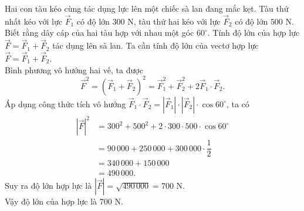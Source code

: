 \begin{ex}%
	Hai con tàu kéo cùng tác dụng lực lên một chiếc sà lan đang mắc kẹt. Tàu thứ nhất kéo với lực $\overrightarrow{F}_1$ có độ lớn $300$ N, tàu thứ hai kéo với lực $\overrightarrow{F}_2$ có độ lớn $500$ N. Biết rằng dây cáp của hai tàu hợp với nhau một góc $60^{\circ}$. Tính độ lớn của hợp lực $\overrightarrow{F} = \overrightarrow{F}_1 + \overrightarrow{F}_2$ tác dụng lên sà lan.
	\loigiai
	{Ta cần tính độ lớn của vectơ hợp lực $\overrightarrow{F} = \overrightarrow{F}_1 + \overrightarrow{F}_2$.\\
	Bình phương vô hướng hai vế, ta được
	$$ \overrightarrow{F}^2 = \left( \overrightarrow{F}_1 + \overrightarrow{F}_2 \right)^2 = \overrightarrow{F}_1^2 + \overrightarrow{F}_2^2 + 2\overrightarrow{F}_1 \cdot \overrightarrow{F}_2. $$
	Áp dụng công thức tích vô hướng $\overrightarrow{F}_1 \cdot \overrightarrow{F}_2 = \left|\overrightarrow{F}_1\right| \cdot \left|\overrightarrow{F}_2\right| \cdot \cos 60^{\circ}$, ta có
	$$ \begin{aligned} |\overrightarrow{F}|^2 &= 300^2 + 500^2 + 2 \cdot 300 \cdot 500 \cdot \cos 60^{\circ} \\ &= 90\,000 + 250\,000 + 300\,000 \cdot \dfrac{1}{2} \\ &= 340\,000 + 150\,000 \\ &= 490\,000. \end{aligned} $$
	Suy ra độ lớn hợp lực là $\left|\overrightarrow{F}\right| = \sqrt{490\,000} = 700$ N.\\
	Vậy độ lớn của hợp lực là $700$ N.}
\end{ex}
